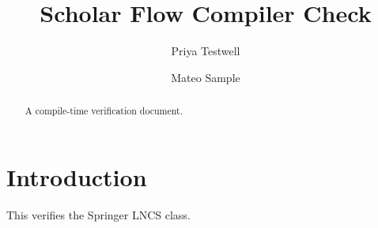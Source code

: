 \documentclass[runningheads]{llncs}
\begin{document}
\title{Scholar Flow Compiler Check}
\author{Priya Testwell \and Mateo Sample}
\maketitle
\begin{abstract}A compile-time verification document.\end{abstract}
\section{Introduction}
This verifies the Springer LNCS class.
\end{document}
